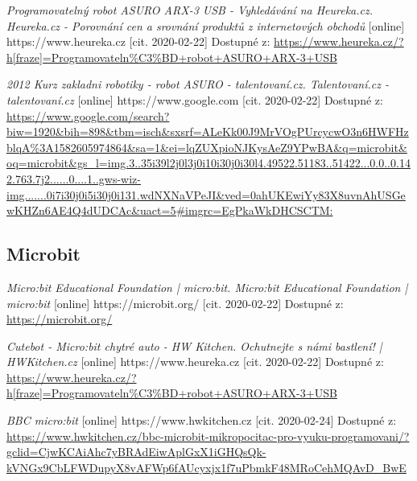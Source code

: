 \documentclass{template/socthesis}
\begin{document}
\begin{thebibliography}{12}
	\textit{Programovatelný robot ASURO ARX-3 USB - Vyhledávání na Heureka.cz. Heureka.cz - Porovnání cen a srovnání produktů z internetových obchodů } [online] https://www.heureka.cz [cit. 2020-02-22] Dostupné z:
	\url{https://www.heureka.cz/?h[fraze]=Programovateln%C3%BD+robot+ASURO+ARX-3+USB}
		
	
	\textit{2012 Kurz zakladni robotiky - robot ASURO - talentovaní.cz. Talentovaní.cz - talentovaní.cz} [online] https://www.google.com [cit. 2020-02-22] Dostupné z:
	\url{https://www.google.com/search?biw=1920&bih=898&tbm=isch&sxsrf=ALeKk00J9MrVOgPUrcycwO3n6HWFHzblqA%3A1582605974864&sa=1&ei=lqZUXpioNJKysAeZ9YPwBA&q=microbit&oq=microbit&gs_l=img.3..35i39l2j0l3j0i10i30j0i30l4.49522.51183..51422...0.0..0.142.763.7j2......0....1..gws-wiz-img.......0i7i30j0i5i30j0i131.wdNXNaVPeJI&ved=0ahUKEwiYy83X8uvnAhUSGewKHZn6AE4Q4dUDCAc&uact=5#imgrc=EgPkaWkDHCSCTM:}
		
	\subsection*{Microbit}
	\textit{Micro:bit Educational Foundation | micro:bit. Micro:bit Educational Foundation | micro:bit} [online] https://microbit.org/ [cit. 2020-02-22] Dostupné z:
	\url{https://microbit.org/}
		
	\textit{Cutebot - Micro:bit chytré auto - HW Kitchen. Ochutnejte s námi bastlení! | HWKitchen.cz} [online] https://www.heureka.cz [cit. 2020-02-22] Dostupné z:
	\url{https://www.heureka.cz/?h[fraze]=Programovateln%C3%BD+robot+ASURO+ARX-3+USB}
	
	\textit{BBC micro:bit} [online] https://www.hwkitchen.cz [cit. 2020-02-24] Dostupné z:
	\url{https://www.hwkitchen.cz/bbc-microbit-mikropocitac-pro-vyuku-programovani/?gclid=CjwKCAiAhc7yBRAdEiwAplGxX1iGHQsQk-kVNGx9CbLFWDupyX8vAFWp6fAUcyxjx1f7uPbmkF48MRoCehMQAvD_BwE}
			

\end{thebibliography}
\end{document}
